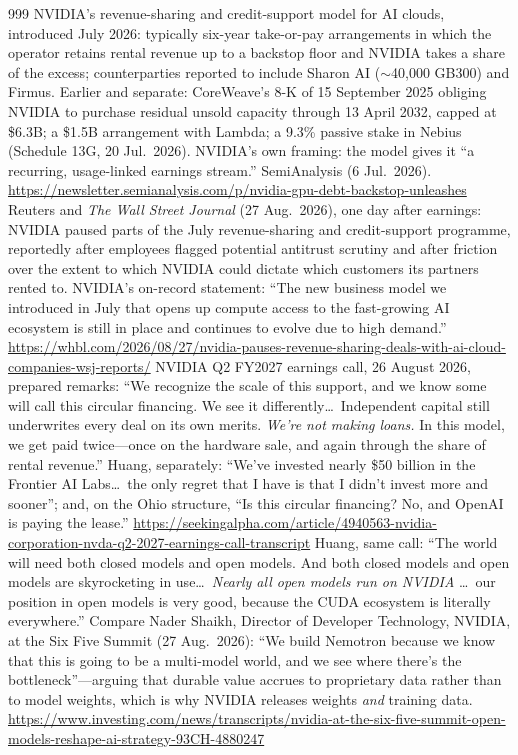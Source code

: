 \begin{thebibliography}{999}
 NVIDIA's revenue-sharing and credit-support model for AI clouds, introduced July 2026: typically six-year take-or-pay arrangements in which the operator retains rental revenue up to a backstop floor and NVIDIA takes a share of the excess; counterparties reported to include Sharon AI ($\sim$40{,}000 GB300) and Firmus. Earlier and separate: CoreWeave's 8-K of 15 September 2025 obliging NVIDIA to purchase residual unsold capacity through 13 April 2032, capped at \$6.3B; a \$1.5B arrangement with Lambda; a 9.3\% passive stake in Nebius (Schedule 13G, 20 Jul.\ 2026). NVIDIA's own framing: the model gives it ``a recurring, usage-linked earnings stream.'' SemiAnalysis (6 Jul.\ 2026). \url{https://newsletter.semianalysis.com/p/nvidia-gpu-debt-backstop-unleashes}
 Reuters and \emph{The Wall Street Journal} (27 Aug.\ 2026), one day after earnings: NVIDIA paused parts of the July revenue-sharing and credit-support programme, reportedly after employees flagged potential antitrust scrutiny and after friction over the extent to which NVIDIA could dictate which customers its partners rented to. NVIDIA's on-record statement: ``The new business model we introduced in July that opens up compute access to the fast-growing AI ecosystem is still in place and continues to evolve due to high demand.'' \url{https://whbl.com/2026/08/27/nvidia-pauses-revenue-sharing-deals-with-ai-cloud-companies-wsj-reports/}
 NVIDIA Q2 FY2027 earnings call, 26 August 2026, prepared remarks: ``We recognize the scale of this support, and we know some will call this circular financing. We see it differently\ldots\ Independent capital still underwrites every deal on its own merits. \emph{We're not making loans.} In this model, we get paid twice---once on the hardware sale, and again through the share of rental revenue.'' Huang, separately: ``We've invested nearly \$50 billion in the Frontier AI Labs\ldots\ the only regret that I have is that I didn't invest more and sooner''; and, on the Ohio structure, ``Is this circular financing? No, and OpenAI is paying the lease.'' \url{https://seekingalpha.com/article/4940563-nvidia-corporation-nvda-q2-2027-earnings-call-transcript}
 Huang, same call: ``The world will need both closed models and open models. And both closed models and open models are skyrocketing in use\ldots\ \emph{Nearly all open models run on NVIDIA} \ldots\ our position in open models is very good, because the CUDA ecosystem is literally everywhere.'' Compare Nader Shaikh, Director of Developer Technology, NVIDIA, at the Six Five Summit (27 Aug.\ 2026): ``We build Nemotron because we know that this is going to be a multi-model world, and we see where there's the bottleneck''---arguing that durable value accrues to proprietary data rather than to model weights, which is why NVIDIA releases weights \emph{and} training data. \url{https://www.investing.com/news/transcripts/nvidia-at-the-six-five-summit-open-models-reshape-ai-strategy-93CH-4880247}

\end{thebibliography}
